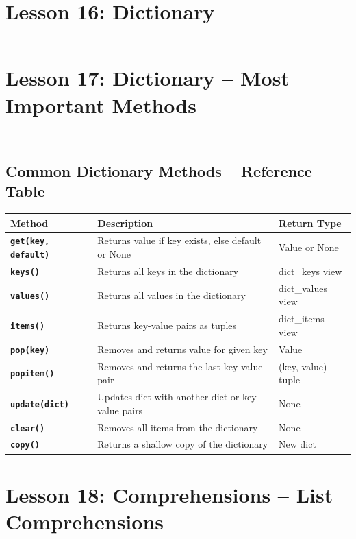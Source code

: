 \documentclass[a4paper,11pt]{article}
\begin{document}
\section{Lesson 16: Dictionary}
\inputminted{python}{Python_Files/dict_basics_guid.py}


\section{Lesson 17: Dictionary – Most Important Methods}
\inputminted{python}{Python_Files/dict_methods_guid.py}

\inputminted{python}{Python_Files/dict_key_value_item_get_examples.py}

\vspace{1em}
\subsection*{Common Dictionary Methods – Reference Table}

\renewcommand{\arraystretch}{1.6}
\begin{tabular}{>{\bfseries}p{4cm} p{6.5cm} p{2.8cm}}
	\toprule
	Method & Description & Return Type \\
	\midrule
	
	\texttt{get(key, default)} & Returns value if key exists, else default or None & Value or None \\
	\texttt{keys()} & Returns all keys in the dictionary & dict\_keys view \\
	\texttt{values()} & Returns all values in the dictionary & dict\_values view \\
	\texttt{items()} & Returns key-value pairs as tuples & dict\_items view \\
	\texttt{pop(key)} & Removes and returns value for given key & Value \\
	\texttt{popitem()} & Removes and returns the last key-value pair & (key, value) tuple \\
	\texttt{update(dict)} & Updates dict with another dict or key-value pairs & None \\
	\texttt{clear()} & Removes all items from the dictionary & None \\
	\texttt{copy()} & Returns a shallow copy of the dictionary & New dict \\
	
	\bottomrule
\end{tabular}

\section{Lesson 18: Comprehensions – List Comprehensions}
\inputminted{python}{Python_Files/comprehensions_list_guid.py}
\end{document}
